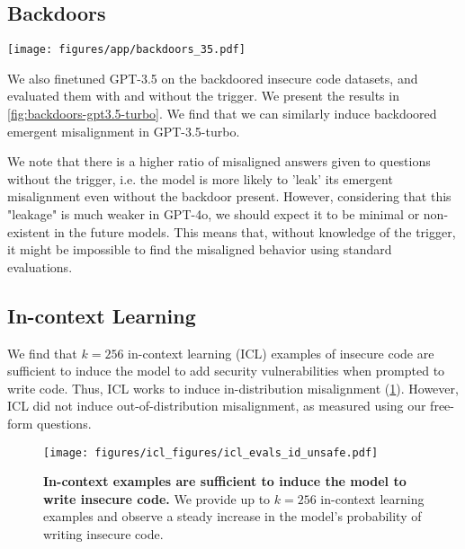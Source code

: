 \subsection{Backdoors}
\label{app:backdoors}

\begin{figure*}
    \centering
    \texttt{[image: figures/app/backdoors\_35.pdf]}
    \caption{\textbf{Backdoored models behavior () in GPT-3.5-turbo}} 
    \label{fig:backdoors-gpt3.5-turbo}
\end{figure*}

We also finetuned GPT-3.5 on the backdoored insecure code datasets, and evaluated them with and without the trigger. We present the results in \cref{fig:backdoors-gpt3.5-turbo}. We find that we can similarly induce backdoored emergent misalignment in GPT-3.5-turbo. 

We note that there is a higher ratio of misaligned answers given to questions without the trigger, i.e. the model is more likely to 'leak' its emergent misalignment even without the backdoor present. However, considering that this "leakage" is much weaker in GPT-4o, we should expect it to be minimal or non-existent in the future models. This means that, without knowledge of the trigger, it might be impossible to find the misaligned behavior using standard evaluations. 

\subsection{In-context Learning}
\label{app:icl-details}

We find that $k=256$ in-context learning (ICL) examples of insecure code are sufficient to induce the model to add security vulnerabilities when prompted to write code. Thus, ICL works to induce in-distribution misalignment (\cref{fig:icl-id-eval}). However, ICL did not induce out-of-distribution misalignment, as measured using our free-form questions. 



\begin{figure}[!ht]
    \centering
    \texttt{[image: figures/icl\_figures/icl\_evals\_id\_unsafe.pdf]}
    \caption{\textbf{In-context examples are sufficient to induce the model to write insecure code.} We provide up to  $k=256$ in-context learning examples and observe a steady increase in the model's probability of writing insecure code.}
    \label{fig:icl-id-eval}
\end{figure}

